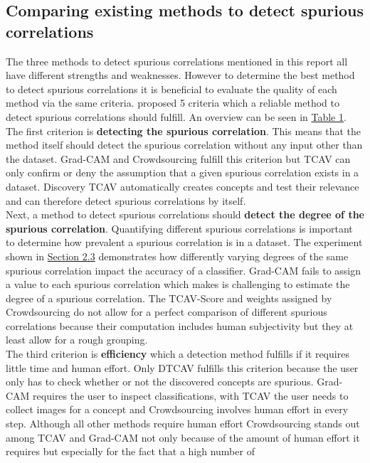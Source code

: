\documentclass{article}
\begin{document}
\subsection{Comparing existing methods to detect spurious correlations}
The three methods to detect spurious correlations mentioned in this report all have different strengths and weaknesses.
However to determine the best method to detect spurious correlations it is beneficial to evaluate the quality of each method
via the same criteria. \cite{tong2020investigating} proposed 5 criteria which a reliable method to
detect spurious correlations should fulfill. An overview can be seen in \hyperref[tab:comparison]{Table 1}.\\
The first criterion is \textbf{detecting the spurious correlation}. This means that the method itself should detect
the spurious correlation without any input other than the dataset. Grad-CAM and Crowdsourcing fulfill this criterion
but TCAV can only confirm or deny the assumption that a given spurious correlation exists in a dataset. Discovery TCAV automatically
creates concepts and test their relevance and can therefore detect spurious correlations by itself.\\
Next, a method to detect spurious correlations should \textbf{detect the degree of the spurious correlation}.
Quantifying different spurious correlations is important to determine how prevalent a spurious correlation is in a dataset.
The experiment shown in \hyperref[sec:motivation]{Section 2.3} demonstrates how differently varying degrees of the same
spurious correlation impact the accuracy of a classifier. Grad-CAM fails to assign a value to each spurious correlation
which makes is challenging to estimate the degree of a spurious correlation. The TCAV-Score and weights assigned by
Crowdsourcing do not allow for a perfect comparison of different spurious correlations because their computation includes
human subjectivity but they at least allow for a rough grouping. \\
The third criterion is \textbf{efficiency} which a detection method fulfills if it requires little time and human effort.
Only DTCAV fulfills this criterion because the user only has to check whether or not the discovered concepts are spurious. 
Grad-CAM requires the user to inspect classifications, with TCAV the user needs to collect images for a concept and Crowdsourcing involves
human effort in every step. Although all other methods require human effort Crowdsourcing stands out among TCAV and Grad-CAM
not only because of the amount of human effort it requires but especially for the fact that a high number of
\end{document}
